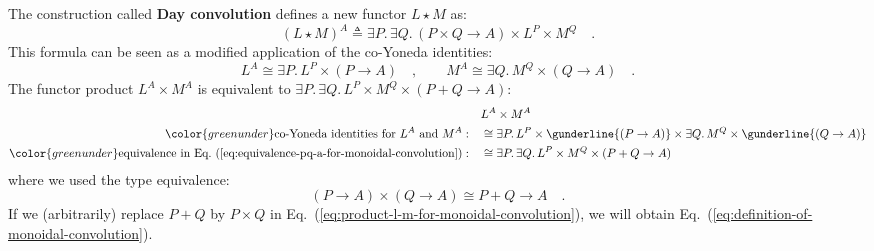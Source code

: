 The construction called \textbf{Day convolution}
defines a new functor $L\star M$ as:
\begin{equation}
\left(L\star M\right)^{A}\triangleq\exists P.\,\exists Q.\,\left(P\times Q\rightarrow A\right)\times L^{P}\times M^{Q}\quad.\label{eq:definition-of-monoidal-convolution}
\end{equation}
This formula can be seen as a modified application of the co-Yoneda
identities:
\[
L^{A}\cong\exists P.\,L^{P}\times\left(P\rightarrow A\right)\quad,\quad\quad M^{A}\cong\exists Q.\,M^{Q}\times\left(Q\rightarrow A\right)\quad.
\]
The functor product $L^{A}\times M^{A}$ is equivalent to $\exists P.\,\exists Q.\,L^{P}\times M^{Q}\times\left(P+Q\rightarrow A\right)$:
\begin{align}
 & L^{A}\times M^{A}\nonumber \\
{\color{greenunder}\text{co-Yoneda identities for }L^{A}\text{ and }M^{A}:}\quad & \cong\exists P.\,L^{P}\times\gunderline{\left(P\rightarrow A\right)}\times\exists Q.\,M^{Q}\times\gunderline{\left(Q\rightarrow A\right)}\nonumber \\
{\color{greenunder}\text{equivalence in Eq.~(\ref{eq:equivalence-pq-a-for-monoidal-convolution})}:}\quad & \cong\exists P.\,\exists Q.\,L^{P}\times M^{Q}\times\left(P+Q\rightarrow A\right)\label{eq:product-l-m-for-monoidal-convolution}
\end{align}
where we used the type equivalence:
\begin{equation}
\left(P\rightarrow A\right)\times\left(Q\rightarrow A\right)\cong P+Q\rightarrow A\quad.\label{eq:equivalence-pq-a-for-monoidal-convolution}
\end{equation}
If we (arbitrarily) replace $P+Q$ by $P\times Q$ in Eq.~(\ref{eq:product-l-m-for-monoidal-convolution}),
we will obtain Eq.~(\ref{eq:definition-of-monoidal-convolution}).


